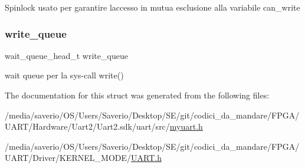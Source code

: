 Spinlock usato per garantire l\textquotesingle{}accesso in mutua esclusione alla variabile can\+\_\+write \mbox{\label{structUART_a542eba258c8dc4e6fb650e7d404649a7}} 
\subsubsection{\texorpdfstring{write\+\_\+queue}{write\_queue}}
{\footnotesize\ttfamily wait\+\_\+queue\+\_\+head\+\_\+t write\+\_\+queue}

wait queue per la sys-\/call write() 

The documentation for this struct was generated from the following files\+:\begin{DoxyCompactItemize}
\item 
/media/saverio/\+O\+S/\+Users/\+Saverio/\+Desktop/\+S\+E/git/codici\+\_\+da\+\_\+mandare/\+F\+P\+G\+A/\+U\+A\+R\+T/\+Hardware/\+Uart2/\+Uart2.\+sdk/uart/src/\hyperlink{myuart_8h}{myuart.\+h}\item 
/media/saverio/\+O\+S/\+Users/\+Saverio/\+Desktop/\+S\+E/git/codici\+\_\+da\+\_\+mandare/\+F\+P\+G\+A/\+U\+A\+R\+T/\+Driver/\+K\+E\+R\+N\+E\+L\+\_\+\+M\+O\+D\+E/\hyperlink{UART_8h}{U\+A\+R\+T.\+h}\end{DoxyCompactItemize}
